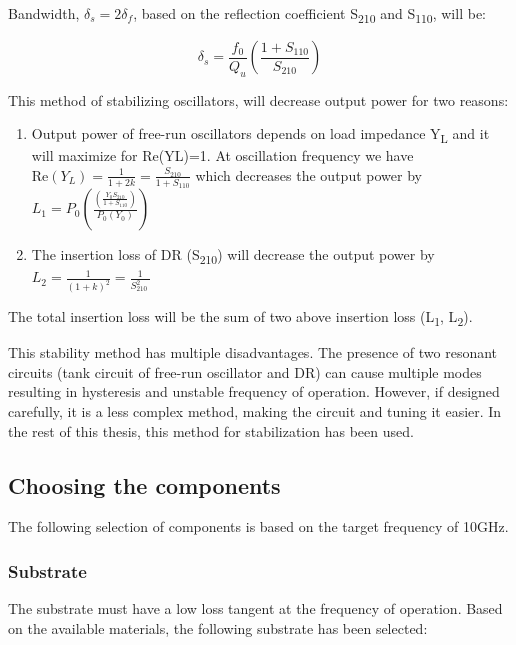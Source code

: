 Bandwidth, \(\delta_{s} = 2\delta_{f}\), based on the reflection
coefficient S\textsubscript{210} and S\textsubscript{110}, will be:

\[\delta_{s} = \frac{f_{0}}{Q_{u}}\left( \frac{1 + S_{110}}{S_{210}} \right)\]

This method of stabilizing oscillators, will decrease output power for
two reasons:

\begin{enumerate}
\def\labelenumi{\arabic{enumi}.}
\item
  Output power of free-run oscillators depends on load impedance
  Y\textsubscript{L} and it will maximize for Re(YL)=1. At oscillation
  frequency we have
  \(\text{Re}\left( Y_{L} \right) = \frac{1}{1 + 2k} = \frac{S_{210}}{1 + S_{110}}\)
  which decreases the output power by
  \(L_{1} = P_{0}\left( \frac{\left( \frac{Y_{0}S_{210}}{1 + S_{110}} \right)}{P_{0}\left( Y_{0} \right)} \right)\)
\item
  The insertion loss of DR (S\textsubscript{210}) will decrease the
  output power by
  \(L_{2} = \frac{1}{\left( 1 + k \right)^{2}} = \frac{1}{S_{210}^{2}\ }\)
\end{enumerate}

The total insertion loss will be the sum of two above insertion loss
(L\textsubscript{1}, L\textsubscript{2}).

This stability method has multiple disadvantages. The presence of two
resonant circuits (tank circuit of free-run oscillator and DR) can cause
multiple modes resulting in hysteresis and unstable frequency of
operation. However, if designed carefully, it is a less complex method,
making the circuit and tuning it easier. In the rest of this thesis,
this method for stabilization has been used.

\hypertarget{choosing-the-components}{%
\subsection{Choosing the components}\label{choosing-the-components}}

The following selection of components is based on the target frequency
of 10GHz.

\hypertarget{substrate}{%
\subsubsection{\texorpdfstring{
Substrate}{ Substrate}}\label{substrate}}

The substrate must have a low loss tangent at the frequency of
operation. Based on the available materials, the following substrate has
been selected:


